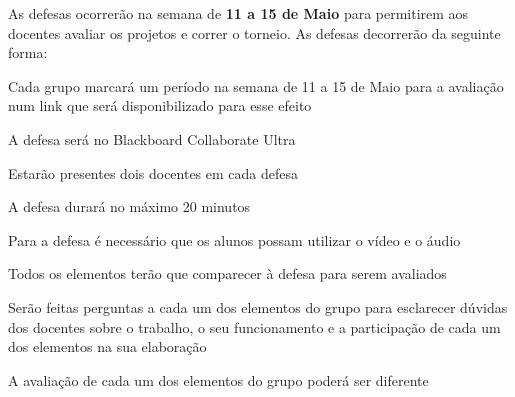 As defesas ocorrerão na semana de {\bfseries 11 a 15 de Maio} para permitirem aos docentes avaliar os projetos e correr o torneio. As defesas decorrerão da seguinte forma\+:


\begin{DoxyItemize}
\item Cada grupo marcará um período na semana de 11 a 15 de Maio para a avaliação num link que será disponibilizado para esse efeito
\item A defesa será no Blackboard Collaborate Ultra
\item Estarão presentes dois docentes em cada defesa
\item A defesa durará no máximo 20 minutos
\item Para a defesa é necessário que os alunos possam utilizar o vídeo e o áudio
\item Todos os elementos terão que comparecer à defesa para serem avaliados
\item Serão feitas perguntas a cada um dos elementos do grupo para esclarecer dúvidas dos docentes sobre o trabalho, o seu funcionamento e a participação de cada um dos elementos na sua elaboração
\item A avaliação de cada um dos elementos do grupo poderá ser diferente 
\end{DoxyItemize}